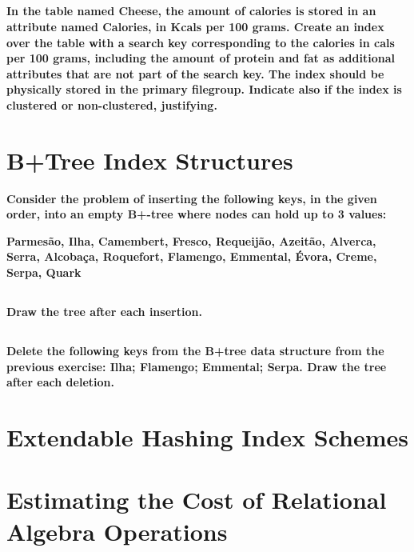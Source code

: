 \documentclass[11pt,report]{article}
\begin{document}
	\subsection{}
	\textbf{In the table named Cheese, the amount of calories is stored in an attribute named Calories, in Kcals per 100 grams. Create an index over the table with a search key corresponding to the calories in cals per 100 grams, including the amount of protein and fat as additional attributes that are not part of the search key. The index should be physically stored in the primary filegroup. Indicate also if the index is clustered or non-clustered, justifying.}

\section{B+Tree Index Structures}
	\textbf{Consider the problem of inserting the following keys, in the given order, into an empty B+-tree where nodes can hold up to 3 values:}
	
	\textbf{Parmesão, Ilha, Camembert, Fresco, Requeijão, Azeitão, Alverca, Serra, Alcobaça, Roquefort, Flamengo, Emmental, Évora, Creme, Serpa, Quark}

	\subsection{}
	\textbf{Draw the tree after each insertion.}


	\subsection{}
	\textbf{Delete the following keys from the B+tree data structure from the previous exercise: Ilha; Flamengo; Emmental; Serpa. Draw the tree after each deletion.}

\section{Extendable Hashing Index Schemes}


\section{Estimating the Cost of Relational Algebra Operations}
	\subsection{}
	\subsection{}
\end{document}
